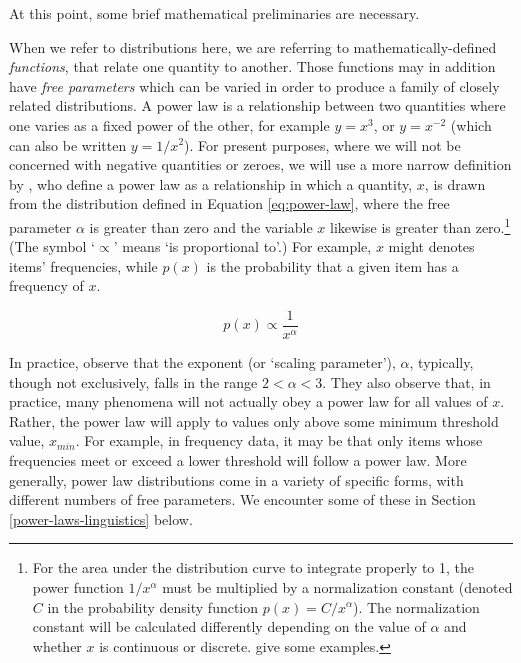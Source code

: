 At this point, some brief mathematical preliminaries are necessary.

When we refer to distributions here, we are referring to mathematically-defined \emph{functions}, that relate one quantity to another. Those functions may in addition have \emph{free parameters} which can be varied in order to produce a family of closely related distributions. A power law is a relationship between two quantities where one varies as a fixed power of the other, for example \(y = x^3\), or \(y = x^{-2}\) (which can also be written \(y = 1/x^2\)). For present purposes, where we will not be concerned with negative quantities or zeroes, we will use a more narrow definition by \textcite[p.~662]{clauset_power-law_2009}, who define a power law as a relationship in which a quantity, \(x\), is drawn from the distribution defined in Equation \eqref{eq:power-law}, where the free parameter \(\alpha\) is greater than zero and the variable \(x\) likewise is greater than zero.\footnote{For the area under the distribution curve to integrate properly to 1, the power function \(1/x^{\alpha}\) must be multiplied by a normalization constant (denoted \(C\) in the probability density function \(p(x) = C/x^{\alpha}\)). The normalization constant will be calculated differently depending on the value of \(\alpha\) and whether \(x\) is continuous or discrete. \textcite[p.~664]{clauset_power-law_2009} give some examples.} (The symbol `\(\propto\)' means `is proportional to'.) For example, \(x\) might denotes items' frequencies, while \(p(x)\) is the probability that a given item has a frequency of \(x\).

\begin{equation}
p(x) \propto \frac{1}{x^{\alpha}}
\label{eq:power-law}
\end{equation}

In practice, \textcite[p.~662]{clauset_power-law_2009} observe that the exponent (or `scaling parameter'), \(\alpha\), typically, though not exclusively, falls in the range \(2 < \alpha < 3\). They also observe that, in practice, many phenomena will not actually obey a power law for all values of \(x\). Rather, the power law will apply to values only above some minimum threshold value, \(x_{min}\). For example, in frequency data, it may be that only items whose frequencies meet or exceed a lower threshold will follow a power law. More generally, power law distributions come in a variety of specific forms, with different numbers of free parameters. We encounter some of these in Section \ref{power-laws-linguistics} below.

